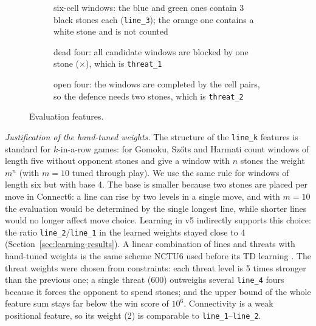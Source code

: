 \documentclass[a4paper,10pt,twocolumn]{article}
\newcommand{\code}[1]{\texttt{#1}}
\newcommand{\board}[4]{%
  \fill[board] (#1-0.6,-#3+0.6) rectangle (#2+0.6,-#4-0.6);
  \foreach \c in {#1,...,#2} {\draw[black!60,line width=0.3pt] (\c,-#3) -- (\c,-#4);
     \node[font=\tiny,above] at (\c,-#3+0.45) {\pgfmathparse{int(\c+64)}\char\pgfmathresult};}
  \foreach \r in {#3,...,#4} {\draw[black!60,line width=0.3pt] (#1,-\r) -- (#2,-\r);
     \node[font=\tiny,left] at (#1-0.45,-\r) {\pgfmathparse{int(\r+64)}\char\pgfmathresult};}
}
\newcommand{\B}[2]{\node[bstone] at (#1,-#2) {};}
\newcommand{\W}[2]{\node[wstone] at (#1,-#2) {};}
\begin{document}
\begin{figure}[t]
\centering
\begin{subfigure}[b]{0.36\textwidth}\centering
{}
\caption{six-cell windows: the blue and green ones contain 3 black stones each (\code{line\_3}); the orange one contains a white stone and is not counted}
\end{subfigure}\hfill
\begin{subfigure}[b]{0.28\textwidth}\centering
{}
\caption{dead four: all candidate windows are blocked by one stone ($\times$), which is \code{threat\_1}}
\end{subfigure}\hfill
\begin{subfigure}[b]{0.30\textwidth}\centering
{}
\caption{open four: the windows are completed by the cell pairs, so the defence needs two stones, which is \code{threat\_2}}
\end{subfigure}
\caption{Evaluation features.}
\label{fig:features}
\end{figure}

\emph{Justification of the hand-tuned weights.} The structure of the \code{line\_k} features is standard for $k$-in-a-row games: for Gomoku, Szőts and Harmati \citeyearpar{szots2018gomoku} count windows of length five without opponent stones and give a window with $n$ stones the weight $m^n$ (with $m=10$ tuned through play). We use the same rule for windows of length six but with base 4. The base is smaller because two stones are placed per move in Connect6: a line can rise by two levels in a single move, and with $m=10$ the evaluation would be determined by the single longest line, while shorter lines would no longer affect move choice. Learning in v5 indirectly supports this choice: the ratio \code{line\_2}/\code{line\_1} in the learned weights stayed close to 4 (Section~\ref{sec:learning-results}). A linear combination of lines and threats with hand-tuned weights is the same scheme NCTU6 used before its TD learning \citep{wu2012td}. The threat weights were chosen from constraints: each threat level is 5 times stronger than the previous one; a single threat (600) outweighs several \code{line\_4} fours because it forces the opponent to spend stones; and the upper bound of the whole feature sum stays far below the win score of $10^6$. Connectivity is a weak positional feature, so its weight (2) is comparable to \code{line\_1}--\code{line\_2}.
\end{document}
